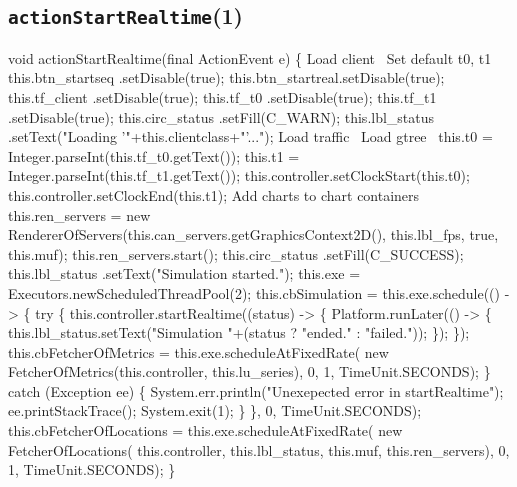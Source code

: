 \subsection{\texttt{actionStartRealtime}(1)}
\nwenddocs{}\endmoddef{}
void actionStartRealtime(final ActionEvent e) \{
  \LA{}Load client~{\nwtagstyle{}}\RA{}
  \LA{}Set default t0, t1~{\nwtagstyle{}}\RA{}
  this.btn_startseq .setDisable(true);
  this.btn_startreal.setDisable(true);
  this.tf_client     .setDisable(true);
  this.tf_t0        .setDisable(true);
  this.tf_t1        .setDisable(true);
  this.circ_status  .setFill(C_WARN);
  this.lbl_status   .setText("Loading '"+this.clientclass+"'...");
  \LA{}Load traffic~{\nwtagstyle{}}\RA{}
  \LA{}Load gtree~{\nwtagstyle{}}\RA{}
  this.t0 = Integer.parseInt(this.tf_t0.getText());
  this.t1 = Integer.parseInt(this.tf_t1.getText());
  this.controller.setClockStart(this.t0);
  this.controller.setClockEnd(this.t1);
  \LA{}Add charts to chart containers~{\nwtagstyle{}}\RA{}
  this.ren_servers = new RendererOfServers(this.can_servers.getGraphicsContext2D(), this.lbl_fps, true, this.muf);
  this.ren_servers.start();
  this.circ_status  .setFill(C_SUCCESS);
  this.lbl_status   .setText("Simulation started.");
  this.exe = Executors.newScheduledThreadPool(2);
  this.cbSimulation = this.exe.schedule(() -> \{
    try \{
      this.controller.startRealtime((status) -> \{
        Platform.runLater(() -> \{
          this.lbl_status.setText("Simulation "+(status ? "ended." : "failed."));
        \});
      \});
      this.cbFetcherOfMetrics = this.exe.scheduleAtFixedRate(
          new FetcherOfMetrics(this.controller, this.lu_series), 0, 1, TimeUnit.SECONDS);
    \} catch (Exception ee) \{
      System.err.println("Unexepected error in startRealtime");
      ee.printStackTrace();
      System.exit(1);
    \}
  \}, 0, TimeUnit.SECONDS);
  this.cbFetcherOfLocations = this.exe.scheduleAtFixedRate(
      new FetcherOfLocations(
        this.controller, this.lbl_status, this.muf, this.ren_servers), 0, 1, TimeUnit.SECONDS);
\}
\eatline
{}\nwendcode{}\nwdocspar
